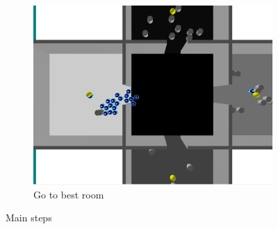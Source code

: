 \begin{figure}[h!]
\begin{subfigure}[b]{0.5\textwidth}
            \includegraphics[width=\textwidth]{images/5_best.png}
            \caption{Go to best room}
        \end{subfigure}
        \caption{Main steps}\label{fig:steps}
\end{figure}

\newpage
